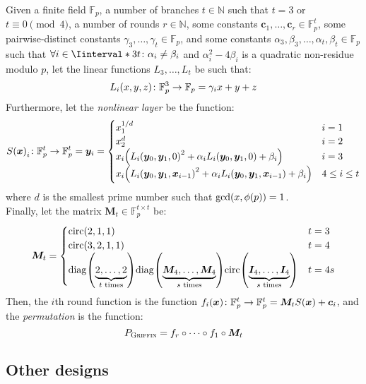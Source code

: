 \begin{definition}
  Given a finite field \(\mathbb{F}_p\), a number of branches \(t \in \mathbb{N}\) such that 
  \(t = 3\) or \(t \equiv 0 \pmod{4}\), a number of rounds \(r \in \mathbb{N}\), some constants 
  \(\bm{c}_{1}, \dots, \bm{c}_{r} \in \mathbb{F}_{p}^{t}\), some pairwise-distinct 
  constants \(\gamma_3, \dots, \gamma_t \in \mathbb{F}_{p}\), and some constants 
  \(\alpha_3, \beta_3, \dots, \alpha_t, \beta_t \in \mathbb{F}_{p}\) such that 
  \(\forall i \in \Iinterval*{3}{t}\colon \alpha_i \neq \beta_i\) and 
  \(\alpha_{i}^{2} - 4\beta_{i}\) is a quadratic non-residue modulo \(p\), 
  let the linear functions \(L_3, \dots, L_t\) be such that:
  \[\call{L_i}{x, y, z}\colon \mathbb{F}_p^3 \to \mathbb{F}_p = \gamma_{i}x + y + z\]
  Furthermore, let the \emph{nonlinear layer} be the function:
  \[
    \call{S}{\bm{x}}_i\colon \mathbb{F}_{p}^{t} \to \mathbb{F}_{p}^{t} = \bm{y}_i =
    \begin{cases}
      x_{1}^{1/d}                                                         & i = 1         \\
      x_{2}^{d}                                                           & i = 2         \\
      x_{i}\Parens*{\call{L_i}{\bm{y}_0, \bm{y}_1, 0}^{2} + 
      \alpha_{i}\call{L_i}{\bm{y}_0, \bm{y}_1, 0} + \beta_i}              & i = 3         \\
      x_{i}\Parens*{\call{L_i}{\bm{y}_0, \bm{y}_1, \bm{x}_{i-1}}^{2} + 
      \alpha_{i}\call{L_i}{\bm{y}_0, \bm{y}_1, \bm{x}_{i-1}} + \beta_i}   & 4 \le i \le t
    \end{cases}
  \]
  where \(d\) is the smallest prime number such that \(\call{\gcd}{x, \call{\totient}{p}} = 1\).\\
  Finally, let the matrix \(\bm{M}_t \in \mathbb{F}_p^{t \times t}\) be:
  \[
    \bm{M}_t = 
    \begin{cases}
      \call{\circulant}{2, 1, 1} & t = 3 \\  
      \call{\circulant}{3, 2, 1, 1} & t = 4 \\
      \call{\diag}{\underbrace{2, \dots, 2}_{\textnormal{\(t\) times}}}
      \call{\diag}{\underbrace{\bm{M}_{4}, \dots, \bm{M}_4}_{\textnormal{\(s\) times}}}
      \call{\circulant}{\underbrace{\bm{I}_4, \dots, \bm{I}_4}_{\textnormal{\(s\) times}}}
      & t = 4s
    \end{cases}
  \]
  Then, the \(i\)th round function is the function 
  \(\call{f_i}{\bm{x}}\colon \mathbb{F}_{p}^{t} \to \mathbb{F}_{p}^{t} = 
    \bm{M}_{t}\call{S}{\bm{x}} + \bm{c}_i\), and the \emph{\Griffin{} permutation} is the function:
  \[
    P_{\textnormal{\textsc{Griffin}}} = f_{r} \circ \cdots \circ f_{1} \circ \bm{M}_{t}
  \]
\end{definition}
\subsection{Other designs}
